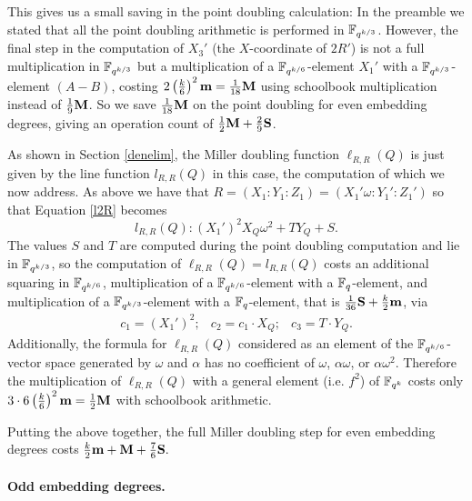 This gives us a small saving in the point doubling calculation:
In the preamble we stated that all the point doubling arithmetic is performed 
in $\mathbb{F}_{q^{k/3}}$. 
However, the final step in the computation of $X_3'$
(the $X$-coordinate of $2R'$) is not a full multiplication in $\mathbb{F}_{q^{k/3}}$
but a multiplication of a $\mathbb{F}_{q^{k/6}}$-element $X_1'$ with a 
$\mathbb{F}_{q^{k/3}}$-element $(A-B)$,
costing $2\left(\frac{k}{6}\right)^2\textbf{m} = \frac{1}{18}\textbf{M}$
using schoolbook multiplication instead of $\frac{1}{9}\textbf{M}$.
So we save $\frac{1}{18}\textbf{M}$ on the point doubling for even embedding degrees, giving an operation count of $\frac{1}{2}\textbf{M} + \frac{2}{9}\textbf{S}$.

As shown in Section \ref{denelim}, the Miller doubling function $\ell_{R,R}(Q)$ is just given by the line function $l_{R,R}(Q)$ in this case, the computation of which we now address.
As above we have that $R = (X_1:Y_1:Z_1) = (X_1'\omega:Y_1':Z_1')$ 
so that Equation \eqref{l2R} becomes
\[l_{R,R}(Q): (X_1')^2X_Q\omega^2 + T Y_Q + S.\]
The values $S$ and $T$ are computed during the point doubling computation and lie in $\mathbb{F}_{q^{k/3}}$,
so the computation of $\ell_{R,R}(Q) = l_{R,R}(Q)$ costs an additional squaring in $\mathbb{F}_{q^{k/6}}$, multiplication of a $\mathbb{F}_{q^{k/6}}$-element with a $\mathbb{F}_{q}$-element, and multiplication of a $\mathbb{F}_{q^{k/3}}$-element with a $\mathbb{F}_{q}$-element, that is 
$\frac{1}{36}\textbf{S} + \frac{k}{2}\textbf{m}$, via
\[\begin{array}{ccc}
c_1 = (X_1')^2; & c_2 = c_1 \cdot  X_Q; & c_3 = T \cdot Y_Q.
\end{array}\]
Additionally, the formula for $\ell_{R,R}(Q)$ considered as an element of the $\mathbb{F}_{q^{k/6}}$-vector space generated by $\omega$ and $\alpha$ has no coefficient of $\omega$, $\alpha\omega$, or $\alpha\omega^2$.
Therefore the multiplication of $\ell_{R,R}(Q)$ with a general element 
(i.e. $f^2$) of
$\mathbb{F}_{q^k}$ costs only $3\cdot 6\left(\frac{k}{6}\right)^2\textbf{m}= \frac{1}{2}\textbf{M}$ with schoolbook arithmetic.

Putting the above together, the full Miller doubling step for even embedding degrees costs
$\frac{k}{2}\textbf{m} + \textbf{M} + \frac{7}{6}\textbf{S}.$

\paragraph*{Odd embedding degrees.}

